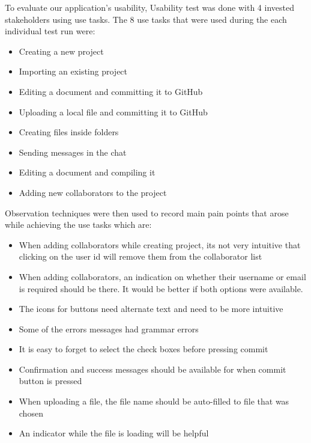 \documentclass[12pt, titlepage]{article}
\begin{document}
To evaluate our application's usability, Usability test was done with 4 invested stakeholders using use tasks. The 8 use tasks that were used during the each individual test run were:
\begin{itemize}
    \item Creating a new project
    \item Importing an existing project
    \item Editing a document and committing it to GitHub
    \item Uploading a local file and committing it to GitHub
    \item Creating files inside folders
    \item Sending messages in the chat
    \item Editing a document and compiling it
    \item Adding new collaborators to the project
\end{itemize}
Observation techniques were then used to record main pain points that arose while achieving the use tasks which are:
\begin{itemize}
    \item When adding collaborators while creating project, its not very intuitive that clicking on the user id will remove them from the collaborator list
    \item When adding collaborators, an indication on whether their username or email is required should be there. It would be better if both options were available.
    \item The icons for buttons need alternate text and need to be more intuitive
    \item Some of the errors messages had grammar errors
    \item It is easy to forget to select the check boxes before pressing commit
    \item Confirmation and success messages should be available for when commit button is pressed
    \item When uploading a file, the file name should be auto-filled to file that was chosen
    \item An indicator while the file is loading will be helpful
\end{itemize}
\end{document}
